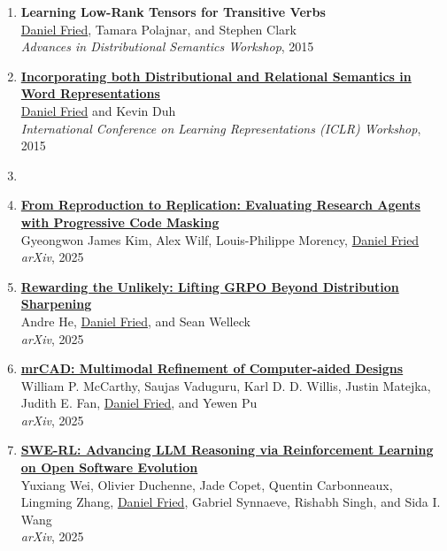 \begin{enumerate}[leftmargin=-1mm,partopsep=0pt]
\item \textbf{Learning Low-Rank Tensors for Transitive Verbs} \\
  \underline{Daniel Fried}, Tamara Polajnar, and Stephen Clark\\
  \emph{Advances in Distributional Semantics Workshop}, 2015

\item \href{http://arxiv.org/abs/1412.5836}{\textbf{Incorporating both Distributional and Relational Semantics in Word Representations}} \\
  \underline{Daniel Fried} and Kevin Duh\\
  \emph{International Conference on Learning Representations (ICLR) Workshop}, 2015

\item[]

\item \href{https://arxiv.org/abs/2506.19724}{\textbf{From Reproduction to Replication: Evaluating Research Agents with Progressive Code Masking}} \\
  Gyeongwon James Kim, Alex Wilf, Louis-Philippe Morency, \underline{Daniel Fried}\\
  \emph{arXiv}, 2025

\item \href{https://arxiv.org/abs/2506.02355}{\textbf{Rewarding the Unlikely: Lifting GRPO Beyond Distribution Sharpening}} \\
  Andre He, \underline{Daniel Fried}, and Sean Welleck\\
  \emph{arXiv}, 2025

\item \href{https://arxiv.org/abs/2504.20294}{\textbf{mrCAD: Multimodal Refinement of Computer-aided Designs}} \\
  William P. McCarthy, Saujas Vaduguru, Karl D. D. Willis, Justin Matejka, Judith E. Fan, \underline{Daniel Fried}, and Yewen Pu\\
  \emph{arXiv}, 2025

\item \href{https://arxiv.org/abs/2502.18449}{\textbf{SWE-RL: Advancing LLM Reasoning via Reinforcement Learning on Open Software Evolution}} \\
  Yuxiang Wei, Olivier Duchenne, Jade Copet, Quentin Carbonneaux, Lingming Zhang, \underline{Daniel Fried}, Gabriel Synnaeve, Rishabh Singh, and Sida I. Wang\\
  \emph{arXiv}, 2025


\end{enumerate}
